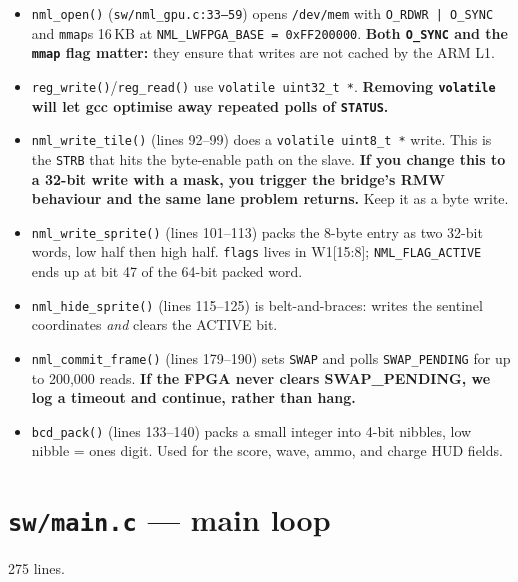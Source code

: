 \documentclass[11pt,letterpaper]{article}
\begin{document}
\begin{itemize}[leftmargin=*]
  \item \texttt{nml\_open()} (\texttt{sw/nml\_gpu.c:33--59}) opens
    \texttt{/dev/mem} with \texttt{O\_RDWR | O\_SYNC} and \texttt{mmap}s
    16\,KB at \texttt{NML\_LWFPGA\_BASE = 0xFF200000}. \textbf{Both
    \texttt{O\_SYNC} and the \texttt{mmap} flag matter:} they ensure that
    writes are not cached by the ARM L1.
  \item \texttt{reg\_write()}/\texttt{reg\_read()} use \texttt{volatile
    uint32\_t *}. \textbf{Removing \texttt{volatile} will let gcc optimise
    away repeated polls of \texttt{STATUS}.}
  \item \texttt{nml\_write\_tile()} (lines 92--99) does a \texttt{volatile
    uint8\_t *} write. This is the \texttt{STRB} that hits the byte-enable
    path on the slave. \textbf{If you change this to a 32-bit write with a
    mask, you trigger the bridge's RMW behaviour and the same lane problem
    returns.} Keep it as a byte write.
  \item \texttt{nml\_write\_sprite()} (lines 101--113) packs the 8-byte
    entry as two 32-bit words, low half then high half. \texttt{flags}
    lives in W1[15:8]; \texttt{NML\_FLAG\_ACTIVE} ends up at bit 47 of the
    64-bit packed word.
  \item \texttt{nml\_hide\_sprite()} (lines 115--125) is
    belt-and-braces: writes the sentinel coordinates \emph{and} clears the
    ACTIVE bit.
  \item \texttt{nml\_commit\_frame()} (lines 179--190) sets \texttt{SWAP}
    and polls \texttt{SWAP\_PENDING} for up to 200{,}000 reads. \textbf{If
    the FPGA never clears SWAP\_PENDING, we log a timeout and continue,
    rather than hang.}
  \item \texttt{bcd\_pack()} (lines 133--140) packs a small integer into
    4-bit nibbles, low nibble = ones digit. Used for the score, wave,
    ammo, and charge HUD fields.
\end{itemize}

\section{\texttt{sw/main.c} --- main loop}

275 lines.
\end{document}
